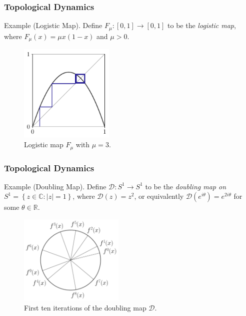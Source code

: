 \documentclass{beamer}
\begin{document}
\begin{frame}
    \frametitle{Topological Dynamics}

    \begin{block}{Example (Logistic Map).}
        Define $F_{\mu}: [0, 1] \to [0, 1]$ to be the \emph{logistic map}, where $F_{\mu}(x)=\mu x(1-x)$ and $\mu > 0$.
        
        \begin{figure}[h]
            \centering
            \includegraphics[width=4.5cm]{../images/logistic_3_0.1}
            \caption{Logistic map $F_\mu$ with $\mu = 3$.}
            \label{fig:logistic_3}
        \end{figure}

    \end{block}
\end{frame}

\begin{frame}
    \frametitle{Topological Dynamics}

    \begin{block}{Example (Doubling Map).}
        Define $\mathcal{D}: S^1 \to S^1$ to be the \emph{doubling map on} $S^1 = \left\lbrace z \in \mathbb{C}: |z| = 1 \right\rbrace$, where $\mathcal{D}(z) = z^2$, or equivalently $\mathcal{D}(e^{i\theta}) = e^{2i\theta}$ for some $\theta \in \mathbb{R}$.

        \begin{figure}[h]
            \centering
            \includegraphics[width=5cm]{../images/doubling_circle}
            \caption{First ten iterations of the doubling map $\mathcal{D}$.}
            \label{fig:doubling-circle}
        \end{figure}
    \end{block}
\end{frame}
\end{document}
